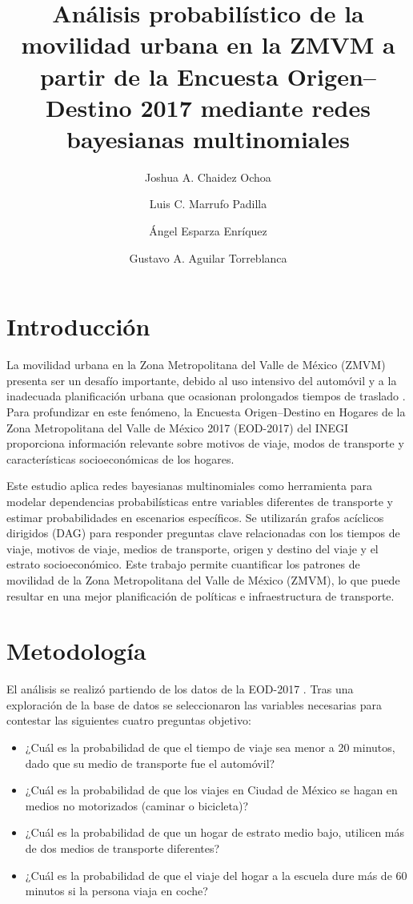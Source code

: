\documentclass[eng]{ajceam-class}
\title {Análisis probabilístico de la movilidad urbana en la ZMVM a partir de la Encuesta Origen–Destino 2017 mediante redes bayesianas multinomiales}
\author[1]{Joshua A. Chaidez Ochoa}
\author[1]{Luis C. Marrufo Padilla}
\author[1]{Ángel Esparza Enríquez}
\author[1]{Gustavo A. Aguilar Torreblanca}
\affil[1]{Tecnológico de Monterrey, Escuela de Ingeniería y Ciencias, Guadalajara, Jalisco}
\begin{document}
\maketitle
\thispagestyle{fancy}

\section{Introducción}
La movilidad urbana en la Zona Metropolitana del Valle de México (ZMVM) presenta ser un desafío importante, debido al uso intensivo del automóvil y a la inadecuada planificación urbana que ocasionan prolongados tiempos de traslado \cite{came2018movilidad}. Para profundizar en este fenómeno, la Encuesta Origen–Destino en Hogares de la Zona Metropolitana del Valle de México 2017 (EOD-2017) del INEGI proporciona información relevante sobre motivos de viaje, modos de transporte y características socioeconómicas de los hogares.

Este estudio aplica redes bayesianas multinomiales como herramienta para modelar dependencias probabilísticas entre variables diferentes de transporte y estimar probabilidades en escenarios específicos. Se utilizarán grafos acíclicos dirigidos (DAG) para responder preguntas clave relacionadas con los tiempos de viaje, motivos de viaje, medios de transporte, origen y destino del viaje y el estrato socioeconómico. Este trabajo permite cuantificar los patrones de movilidad de la Zona Metropolitana del Valle de México (ZMVM), lo que puede resultar en una mejor planificación de políticas e infraestructura de transporte.
 

\section{Metodología}
El análisis se realizó partiendo de los datos de la EOD-2017 \cite{INEGI2017EOD}. Tras una exploración de la base de datos se seleccionaron las variables necesarias para contestar las siguientes cuatro preguntas objetivo:

\begin{itemize}
    \item ¿Cuál es la probabilidad de que el tiempo de viaje sea menor a 20 minutos, dado que su medio de transporte fue el automóvil?
    
    \item  ¿Cuál es la probabilidad de que los viajes en Ciudad de México se hagan en medios no motorizados (caminar o bicicleta)?
    
    \item ¿Cuál es la probabilidad de que un hogar de estrato medio bajo, utilicen más de dos medios de transporte diferentes?

    \item ¿Cuál es la probabilidad de que el viaje del hogar a la escuela dure más de 60 minutos si la persona viaja en coche?
    
\end{itemize}
\end{document}
